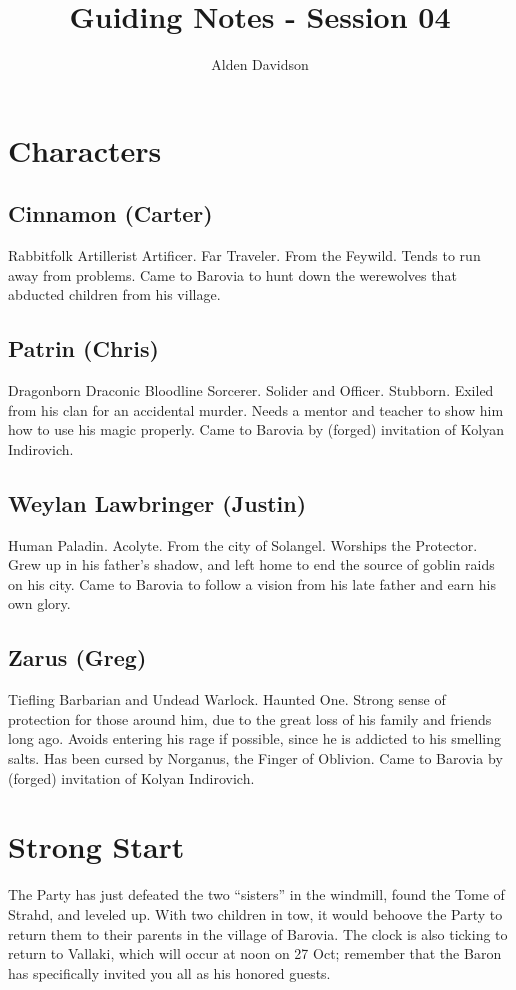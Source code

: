 \documentclass[a4paper,11pt]{article}
\title{Guiding Notes - Session 04}
\author{Alden Davidson}
\begin{document}
\maketitle
\tableofcontents

\pagebreak
\section{Characters}
\label{sec:Characters}
\subsection{Cinnamon (Carter)}
  Rabbitfolk Artillerist Artificer. Far Traveler. From the Feywild. Tends to run away from problems. Came to
  Barovia to hunt down the werewolves that abducted children from his village.
\subsection{Patrin (Chris)}
  Dragonborn Draconic Bloodline Sorcerer. Solider and Officer. Stubborn. Exiled from his clan for an accidental 
  murder. Needs a mentor and teacher to show him how to use his magic properly. Came to Barovia by (forged)
  invitation of Kolyan Indirovich.
\subsection{Weylan Lawbringer (Justin)}
  Human Paladin. Acolyte. From the city of Solangel. Worships the Protector. Grew up in his father's shadow, and 
  left home to end the source of goblin raids on his city. Came to Barovia to follow a vision from his late 
  father and earn his own glory.
\subsection{Zarus (Greg)}
  Tiefling Barbarian and Undead Warlock. Haunted One. Strong sense of protection for those around him, due to the
  great loss of his family and friends long ago. Avoids entering his rage if possible, since he is addicted to 
  his smelling salts. Has been cursed by Norganus, the Finger of Oblivion. Came to Barovia by (forged) 
  invitation of Kolyan Indirovich.


\pagebreak
\section{Strong Start}
\label{sec:StrongStart}
The Party has just defeated the two ``sisters'' in the windmill, found the Tome of Strahd, and leveled up. With
two children in tow, it would behoove the Party to return them to their parents in the village of Barovia. The
clock is also ticking to return to Vallaki, which will occur at noon on 27 Oct; remember that the Baron has
specifically invited you all as his honored guests.
\end{document}
